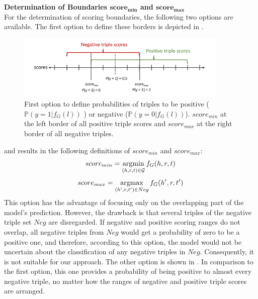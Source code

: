 \textbf{Determination of Boundaries $\textbf{score}_{\textbf{min}}$ and $\textbf{score}_{\textbf{max}}$}\\
For the determination of scoring boundaries, the following two options are available.
The first option to define these borders is depicted in .
\begin{figure}[H]
  \centering
    \includegraphics[width=0.9\textwidth]{figures/positives_negatives1.pdf}
  \caption{First option to define probabilities of triples to be positive ($\mathds{P}(y = 1 | f_G(l))$ ) or negative ($\mathds{P}(y = 0 | f_G(l))$). 
  $score_{min}$ at the left border of all positive triple scores and $score_{max}$ at the right border of all negative triples.}
  \label{fig:positives_negatives1}
\end{figure}
and results in the following definitions of  $score_{min}$ and 
$score_{max}$:
\begin{equation} \label{eqn:opt2_score_min}
    score_{min} = \operatorname*{argmin}_{(h,r,t) \in \mathcal{G}}{f_G(h,r,t)}
\end{equation}
\begin{equation} \label{eqn:opt2_score_max}
    score_{max} = \operatorname*{argmax}_{(h',r,t') \in Neg}{f_G(h',r,t')}
\end{equation}
This option has the advantage of focusing only on the overlapping part of the model's prediction.
However, the drawback is that several triples of the negative triple set $Neg$ are disregarded.
If negative and positive scoring ranges do not overlap, all negative triples from $Neg$ would get a probability of zero to be a positive one, and therefore, according to this option, the model would not be uncertain about the classification of any negative triples in $Neg$.
Consequently, it is not suitable for our approach.
The other option is shown in .
In comparison to the first option, this one provides a probability of being positive to almost every negative triple, no matter how the ranges of negative and positive triple scores are arranged.
